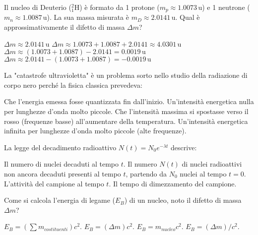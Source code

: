 \documentclass{exam}%
\begin{document}
\begin{questions}
\begin{multicols}{4}
\end{multicols}%
\question Il nucleo di Deuterio ($^2_1\text{H}$) è formato da 1 protone ($m_p \approx 1.0073 \, \text{u}$) e 1 neutrone ($m_n \approx 1.0087 \, \text{u}$). La sua massa misurata è $m_D \approx 2.0141 \, \text{u}$. Qual è approssimativamente il difetto di massa $\Delta m$?%
\vspace{0.2em}%
\begin{multicols}{2}%
\begin{choices}%
\choice $\Delta m \approx 2.0141 \, \text{u}$%
\choice $\Delta m \approx 1.0073 + 1.0087 + 2.0141 \approx 4.0301 \, \text{u}$%
\choice $\Delta m \approx (1.0073 + 1.0087) - 2.0141 = 0.0019 \, \text{u}$%
\choice $\Delta m \approx 2.0141 - (1.0073 + 1.0087) = -0.0019 \, \text{u}$%
\end{choices}%
\end{multicols}%
\question La "catastrofe ultravioletta" è un problema sorto nello studio della radiazione di corpo nero perché la fisica classica prevedeva:%
\vspace{0.2em}%
\begin{choices}%
\choice Che l'energia emessa fosse quantizzata fin dall'inizio.%
\choice Un'intensità energetica nulla per lunghezze d'onda molto piccole.%
\choice Che l'intensità massima si spostasse verso il rosso (frequenze basse) all'aumentare della temperatura.%
\choice Un'intensità energetica infinita per lunghezze d'onda molto piccole (alte frequenze).%
\end{choices}%
\question La legge del decadimento radioattivo $N(t) = N_0 e^{-\lambda t}$ descrive:%
\vspace{0.2em}%
\begin{choices}%
\choice Il numero di nuclei decaduti al tempo $t$.%
\choice Il numero $N(t)$ di nuclei radioattivi non ancora decaduti presenti al tempo $t$, partendo da $N_0$ nuclei al tempo $t=0$.%
\choice L'attività del campione al tempo $t$.%
\choice Il tempo di dimezzamento del campione.%
\end{choices}%
\question Come si calcola l'energia di legame ($E_B$) di un nucleo, noto il difetto di massa $\Delta m$?%
\vspace{0.2em}%
\begin{multicols}{4}%
\begin{choices}%
\choice $E_B = (\sum m_{costituenti}) c^2$.%
\choice $E_B = (\Delta m) c^2$.%
\choice $E_B = m_{nucleo} c^2$.%
\choice $E_B = (\Delta m) / c^2$.%
\end{choices}%
\end{multicols}%

\end{questions}
\end{document}
